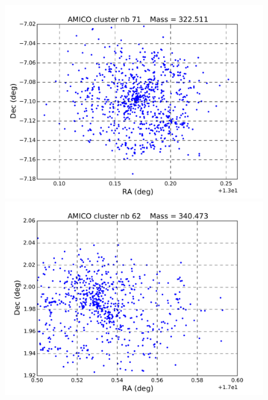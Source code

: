\documentclass[a4paper,11pt]{article}
\numberwithin{equation}{section}
\begin{document}
\begin{figure}[H]
  	\begin{minipage}[b]{0.48\textwidth}
		  \includegraphics[width=\linewidth]{71.pdf}
    \end{minipage}
		\hfill
		\begin{minipage}[b]{0.48\textwidth}
		  \includegraphics[width=\linewidth]{62.pdf}
  	\end{minipage}
  	
  	\vspace{-5pt}
  	

\end{figure}
\end{document}
